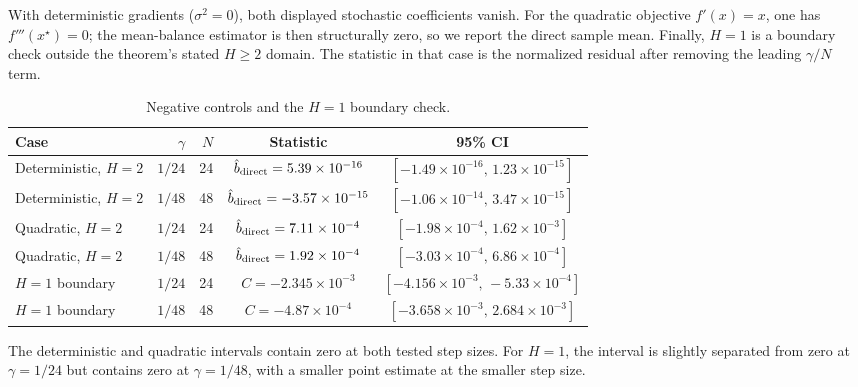 \documentclass[11pt]{article}
\theoremstyle{definition}
\begin{document}
With deterministic gradients ($\sigma^2=0$), both displayed stochastic coefficients vanish. For the quadratic objective $f'(x)=x$, one has $f'''(x^\star)=0$; the mean-balance estimator is then structurally zero, so we report the direct sample mean. Finally, $H=1$ is a boundary check outside the theorem's stated $H\ge2$ domain. The statistic in that case is the normalized residual after removing the leading $\gamma/N$ term.

\begin{table}[H]
\centering
\small
\caption{Negative controls and the $H=1$ boundary check.}
\label{tab:negative-controls}
\begin{tabular}{@{}lrrcc@{}}
\toprule
Case & $\gamma$ & $N$ & Statistic & 95\% CI\\
\midrule
Deterministic, $H=2$ & $1/24$ & 24 & $\hat b_{\rm direct}=5.39\times10^{-16}$ & $[-1.49\times10^{-16},\,1.23\times10^{-15}]$\\
Deterministic, $H=2$ & $1/48$ & 48 & $\hat b_{\rm direct}=-3.57\times10^{-15}$ & $[-1.06\times10^{-14},\,3.47\times10^{-15}]$\\
Quadratic, $H=2$ & $1/24$ & 24 & $\hat b_{\rm direct}=7.11\times10^{-4}$ & $[-1.98\times10^{-4},\,1.62\times10^{-3}]$\\
Quadratic, $H=2$ & $1/48$ & 48 & $\hat b_{\rm direct}=1.92\times10^{-4}$ & $[-3.03\times10^{-4},\,6.86\times10^{-4}]$\\
$H=1$ boundary & $1/24$ & 24 & $C=-2.345\times10^{-3}$ & $[-4.156\times10^{-3},\,-5.33\times10^{-4}]$\\
$H=1$ boundary & $1/48$ & 48 & $C=-4.87\times10^{-4}$ & $[-3.658\times10^{-3},\,2.684\times10^{-3}]$\\
\bottomrule
\end{tabular}
\end{table}

The deterministic and quadratic intervals contain zero at both tested step sizes. For $H=1$, the interval is slightly separated from zero at $\gamma=1/24$ but contains zero at $\gamma=1/48$, with a smaller point estimate at the smaller step size.
\end{document}
